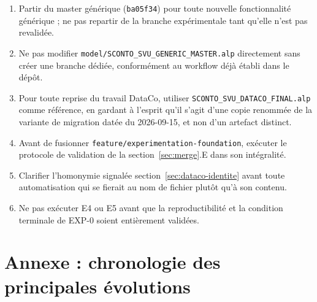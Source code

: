\documentclass[11pt,a4paper]{article}
\newcommand{\code}[1]{\texttt{#1}}
\begin{document}
\begin{enumerate}
  \item Partir du master générique (\code{ba05f34}) pour toute nouvelle
        fonctionnalité générique ; ne pas repartir de la branche
        expérimentale tant qu'elle n'est pas revalidée.
  \item Ne pas modifier \code{model/SCONTO\_SVU\_GENERIC\_MASTER.alp}
        directement sans créer une branche dédiée, conformément au
        workflow déjà établi dans le dépôt.
  \item Pour toute reprise du travail DataCo, utiliser
        \code{SCONTO\_SVU\_DATACO\_FINAL.alp} comme référence, en gardant à
        l'esprit qu'il s'agit d'une copie renommée de la variante de
        migration datée du 2026-09-15, et non d'un artefact distinct.
  \item Avant de fusionner \code{feature/experimentation-foundation},
        exécuter le protocole de validation de la section~\ref{sec:merge}.E
        dans son intégralité.
  \item Clarifier l'homonymie signalée section~\ref{sec:dataco-identite}
        avant toute automatisation qui se fierait au nom de fichier plutôt
        qu'à son contenu.
  \item Ne pas exécuter E4 ou E5 avant que la reproductibilité et la
        condition terminale de EXP-0 soient entièrement validées.
\end{enumerate}

\section*{Annexe : chronologie des principales évolutions}
\end{document}
